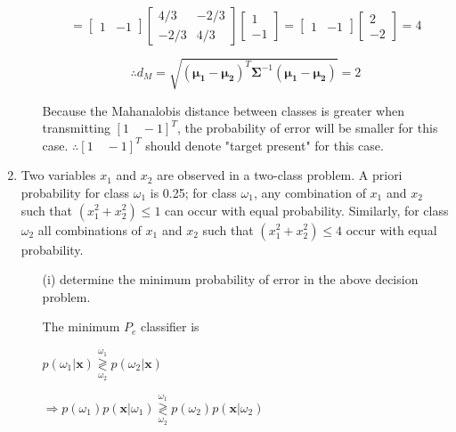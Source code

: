 \documentclass[fleqn]{article}
\begin{document}
\begin{enumerate}
\begin{enumerate}
			\begin{equation*}
				= \begin{bmatrix} 1 & -1 \end{bmatrix}\begin{bmatrix} 4/3 & -2/3 \\ -2/3 & 4/3 \end{bmatrix}\begin{bmatrix} 1 \\ -1 \end{bmatrix} = \begin{bmatrix} 1 & -1 \end{bmatrix}\begin{bmatrix} 2 \\ -2 \end{bmatrix} = 4
			\end{equation*}
			
			\begin{equation*}
				\therefore d_M = \sqrt{(\mathbf{\mu_1} - \mathbf{\mu_2})^T\mathbf{\Sigma}^{-1}(\mathbf{\mu_1} - \mathbf{\mu_2})} = 2
			\end{equation*}
			
			Because the Mahanalobis distance between classes is greater when transmitting $[1 \quad -1]^T$, the probability of error will be smaller for this case. $\therefore [1 \quad -1]^T$ should denote "target present" for this case.
			
		\end{enumerate}
		
		\item Two variables $x_1$ and $x_2$ are observed in a two-class problem. A priori probability for class $\omega_1$ is 0.25; for class $\omega_1$, any combination of $x_1$ and $x_2$ such that $\left(x_1^2 + x_2^2\right) \leq 1$ can occur with equal probability. Similarly, for class $\omega_2$ all combinations of $x_1$ and $x_2$ such that $\left(x_1^2 + x_2^2\right) \leq 4$ occur with equal probability.
		
		\begin{enumerate}
			\item[(i)] determine the minimum probability of error in the above decision problem.
			
			The minimum $P_e$ classifier is
			
			$p(\omega_1|\mathbf{x}) \overset{\omega_1}{\underset{\omega_2}{\gtrless}} p(\omega_2|\mathbf{x})$
			
			$\Rightarrow p(\omega_1)p(\mathbf{x}|\omega_1) \overset{\omega_1}{\underset{\omega_2}{\gtrless}} p(\omega_2)p(\mathbf{x}|\omega_2)$
			

\end{enumerate}
\end{enumerate}
\end{document}
